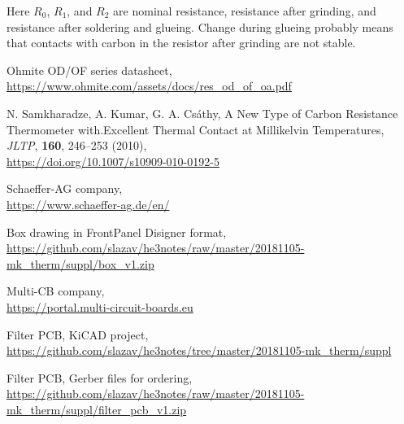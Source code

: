 \documentclass[a4paper]{article}
\begin{document}
Here $R_0$, $R_1$, and $R_2$ are nominal resistance, resistance after
grinding, and resistance after soldering and glueing. Change during
glueing probably means that contacts with carbon in the resistor
after grinding are not stable.

\begin{thebibliography}{}

Ohmite OD/OF series datasheet,\\
\url{https://www.ohmite.com/assets/docs/res_od_of_oa.pdf}

N. Samkharadze, A. Kumar, G. A. Cs{\'a}thy,
A New Type of Carbon Resistance Thermometer with.Excellent Thermal Contact at Millikelvin Temperatures,
{\it JLTP}, {\bf 160}, 246--253 (2010),\\
\url{https://doi.org/10.1007/s10909-010-0192-5}

Schaeffer-AG company,\\
\url{https://www.schaeffer-ag.de/en/}

Box drawing in FrontPanel Disigner format,\\
\url{https://github.com/slazav/he3notes/raw/master/20181105-mk_therm/suppl/box_v1.zip}

Multi-CB company,\\
\url{https://portal.multi-circuit-boards.eu}

Filter PCB, KiCAD project,\\
\url{https://github.com/slazav/he3notes/tree/master/20181105-mk_therm/suppl}

Filter PCB, Gerber files for ordering,\\
\url{https://github.com/slazav/he3notes/raw/master/20181105-mk_therm/suppl/filter\_pcb_v1.zip}

\end{thebibliography}
\end{document}
